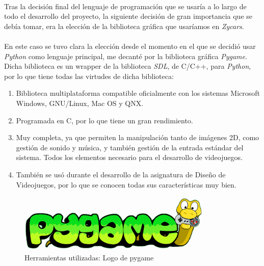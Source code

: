 \paragraph{}
Tras la decisión final del lenguaje de programación que se usaría a lo largo de todo el desarrollo del proyecto, la siguiente
decisión de gran importancia que se debía tomar, era la elección de la
biblioteca gráfica que usaríamos en \emph{Zycars}.

\paragraph{}
En este caso se tuvo clara la elección desde el momento en el que se decidió usar \emph{Python} como lenguaje principal, me decanté
por la biblioteca gráfica \emph{Pygame}. Dicha biblioteca es un wrapper de la biblioteca \emph{SDL}, de C/C++, para \emph{Python}, por
lo que tiene todas las virtudes de dicha biblioteca:

\begin{enumerate}
    \item Biblioteca multiplataforma compatible oficialmente con los sistemas Microsoft Windows, GNU/Linux, Mac OS y QNX.
    
    \item Programada en C, por lo que tiene un gran rendimiento.
    
    \item Muy completa, ya que permiten la manipulación tanto de imágenes 2D, como gestión de sonido y música, y también gestión
    de la entrada estándar del sistema. Todos los elementos necesario para el desarrollo de videojuegos.
    
    \item También se usó durante el desarrollo de la asignatura de Diseño de Videojuegos, por lo que se conocen todas sus 
    características muy bien.
\end{enumerate}

\begin{figure}[H]
  \label{logo_pygame}
  \begin{center}
    \includegraphics[scale=0.6]{imagenes/logo_pygame.png}
  \end{center}
  \caption{Herramientas utilizadas: Logo de pygame}
\end{figure}

